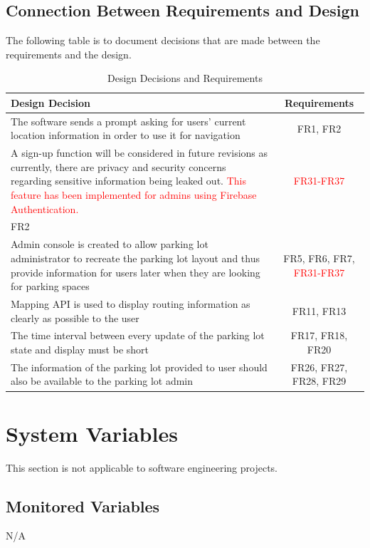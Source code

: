 \documentclass[12pt, titlepage]{article}
\begin{document}
\color{black}
\newpage
\subsection{Connection Between Requirements and Design} \label{SecConnection}
The following table is to document decisions that are made between the
requirements and the design.

\begin{table}[h!]
\caption{Design Decisions and Requirements}
    \centering
    \begin{tabular}{|p{10cm}|c|}
    \hline
    \textbf{Design Decision} & \textbf{Requirements} \\
    \hline
    The software sends a prompt asking for users' current location information
    in order to use it for navigation & FR1, FR2 \\
    \hline
    A sign-up function will be considered in future revisions as currently,
    there are privacy and security concerns regarding sensitive information
    being leaked out. \textcolor{red}{This feature has been implemented for
    admins using Firebase Authentication.} & \textcolor{red}{FR31-FR37}\\%
    FR2\\
    \hline
    Admin console is created to allow parking lot administrator to recreate the
    parking lot layout and thus provide information for users later when they
    are looking for parking spaces & FR5, FR6, FR7, \textcolor{red}{FR31-FR37}\\
    \hline
    Mapping API is used to display routing information as clearly as possible to
    the user & FR11, FR13\\
    \hline
    The time interval between every update of the parking lot state and display
    must be short & FR17, FR18, FR20\\
    \hline
    The information of the parking lot provided to user should also be available
    to the parking lot admin & FR26, FR27, FR28, FR29\\
    \hline
    \end{tabular}
\end{table}

\section{System Variables}

This section is not applicable to software engineering projects.

\subsection{Monitored Variables}
N/A
\end{document}
